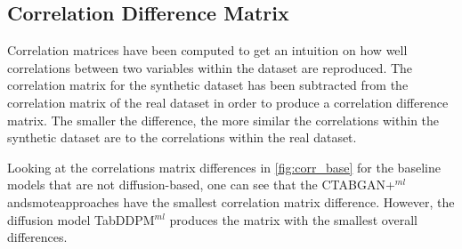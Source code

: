 \subsection{Correlation Difference Matrix}

Correlation matrices have been computed to get an intuition on how well correlations between two variables within the dataset are reproduced.
The correlation matrix for the synthetic dataset has been subtracted from the correlation matrix of the real dataset in order to produce a correlation difference matrix.
The smaller the difference, the more similar the correlations within the synthetic dataset are to the correlations within the real dataset.

Looking at the correlations matrix differences in \autoref{fig:corr_base} for the baseline models that are not diffusion-based, one can see that the CTABGAN+$^{ml}$ and\gls{smote}approaches have the smallest
correlation matrix difference.
However, the diffusion model TabDDPM$^{ml}$ produces the matrix with the smallest overall differences.

